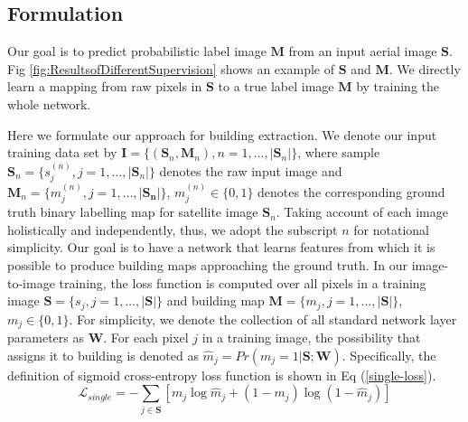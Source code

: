 \documentclass[runningheads]{llncs}
\begin{document}
\subsection{Formulation}
   Our goal is to predict probabilistic label image $\mathbf{M}$ from an input aerial image $\mathbf{S}$. Fig \ref{fig:ResultsofDifferentSupervision} shows an example of $\mathbf{S}$ and $\mathbf{M}$. We directly learn a mapping from raw pixels in $\mathbf{S}$ to a true label image  $\mathbf{M}$ by training the whole network. 
   
    Here we formulate our approach for building extraction. We denote our input training data set by $\mathbf{I} = \{(\mathbf{S}_{n},\mathbf{M}_{n}),n = 1,\ldots,\vert \mathbf{S}_n \vert \}$, where sample $\mathbf{S}_{n} = \{s_{j}^{(n)}, j = 1,\ldots,\vert \mathbf{S}_n \vert \}$ denotes the raw input image and  $\mathbf{M}_{n} = \{m_{j}^{(n)}, j = 1,\ldots,\vert \mathbf{S_n} \vert\}$, $m_j^{(n)} \in \{0,1\}$ denotes the corresponding ground truth binary labelling map for satellite image $\mathbf{S}_{n}$.  Taking account of each image holistically and independently, thus, we adopt the subscript $n$ for notational simplicity. Our goal is to have a network that learns features from which it is possible to produce building maps approaching the ground truth. 
    In our image-to-image training, the loss function is computed over all pixels in a training image $\mathbf{S} = \{s_{j}, j = 1,\ldots,\vert \mathbf{S} \vert\}$ and building map $\mathbf{M} = \{m_{j}, j = 1,\ldots,\vert \mathbf{S} \vert\}$, $m_j \in \{0,1\}$.
For simplicity, we denote the collection of all standard network layer parameters as $\mathbf{W}$. For each pixel $j$ in a training image, the possibility that assigns it to building is denoted as $\hat{m}_j = Pr(m_j = 1|\mathbf{S};\mathbf{W})$. Specifically, the definition of sigmoid cross-entropy loss function is shown in Eq (\ref{single-loss}).
\begin{equation}
	\label{single-loss}
    \mathcal{L}_{single} = - \sum_{j \in \mathbf{S}} \left[ m_j \log{\hat{m}_j} + (1 - m_j)\log{(1 - \hat{m}_j)} \right]
\end{equation}

\end{document}
